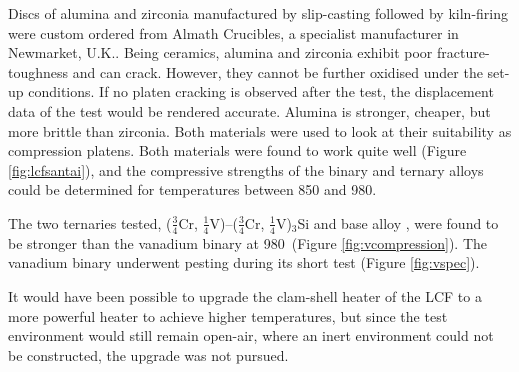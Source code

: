 Discs of alumina and zirconia manufactured by slip-casting followed by kiln-firing were custom ordered from Almath Crucibles, a specialist manufacturer in Newmarket, U.K..  Being ceramics, alumina and zirconia exhibit poor fracture-toughness and can crack.  However, they cannot be further oxidised under the set-up conditions.  If no platen cracking is observed after the test, the displacement data of the test would be rendered accurate.  Alumina is stronger, cheaper, but more brittle than zirconia.  Both materials were used to look at their suitability as compression platens.  Both materials were found to work quite well (Figure \ref{fig:lcfsantai}), and the compressive strengths of the binary and ternary alloys could be determined for temperatures between 850 and 980\celsius. 

The two ternaries tested, ($\frac{3}{4}$Cr, $\frac{1}{4}$V)--($\frac{3}{4}$Cr, $\frac{1}{4}$V)$_3$Si and base alloy , were found to be stronger than the vanadium binary at 980\celsius\ (Figure \ref{fig:vcompression}). The vanadium binary underwent pesting during its short test (Figure \ref{fig:vspec}).

It would have been possible to upgrade the clam-shell heater of the LCF to a more powerful heater to achieve higher temperatures, but since the test environment would still remain open-air, where an inert environment could not be constructed, the upgrade was not pursued.

